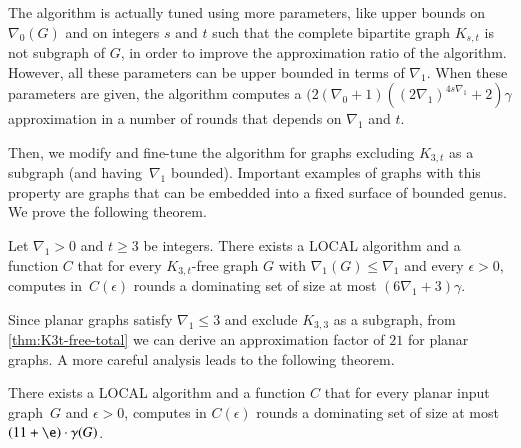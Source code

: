 The algorithm is actually tuned using more parameters, like upper bounds on $\nabla_0(G)$ and
on integers $s$ and $t$ such that the complete bipartite graph $K_{s,t}$
is not subgraph of $G$, in order to  improve the approximation ratio of the algorithm.
However, all these parameters can be upper bounded in terms of $\nabla_1$.
When these parameters are given, the algorithm computes a
$(2(\nabla_0+1)((2\nabla_1)^{4s\nabla_1}+2)\gamma$ approximation
in a number of rounds that depends on $\nabla_1$ and $t$.




\medskip

Then, we modify and fine-tune the algorithm for graphs
excluding $K_{3,t}$ as a subgraph (and having~$\nabla_1$ bounded).
Important examples of graphs with this property are graphs that
can be embedded into a fixed surface of bounded genus. We prove
the following theorem.

\begin{theorem}\label{thm:K3t-free-total}
Let $\nabla_1>0$ and $t\geq 3$ be integers.
There exists a LOCAL algorithm and a function $C$ that for every
$K_{3,t}$-free graph $G$ with $\nabla_1(G)\leq \nabla_1$ and every
$\epsilon>0$, computes in~$C(\epsilon)$ rounds a dominating
set of size at most $(6\nabla_1+3)\gamma$.
\end{theorem}

Since planar graphs satisfy $\nabla_1\leq 3$ and exclude $K_{3,3}$ as
a subgraph, from \cref{thm:K3t-free-total} we can derive an approximation
factor of $21$ for planar graphs. A more careful analysis leads to the
following theorem.

\begin{theorem}\label{thm:planar}
  There exists a LOCAL algorithm and a function $C$ that for every planar
  input graph~$G$ and $\epsilon>0$, computes in $C(\epsilon)$ rounds a dominating set
  of size at most \mbox{$(11+\e)\cdot\gamma(G)$}.
\end{theorem}

